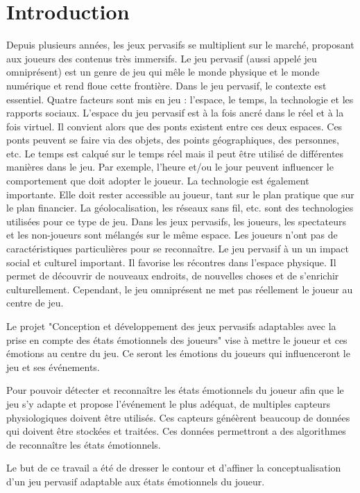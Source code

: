 \documentclass{article}
\begin{document}
\section{Introduction}
	Depuis plusieurs années, les jeux pervasifs se multiplient sur le marché, proposant aux joueurs des contenus très immersifs.
	Le jeu pervasif (aussi appelé jeu omniprésent) est un genre de jeu qui mêle le monde physique et le monde numérique et rend floue cette frontière.
	Dans le jeu pervasif, le contexte est essentiel. 
	Quatre facteurs sont mis en jeu : l'espace, le temps, la technologie et les rapports sociaux. 
	L'espace du jeu pervasif est à la fois ancré dans le réel et à la fois virtuel.
	Il convient alors que des ponts existent entre ces deux espaces. 
	Ces ponts peuvent se faire via des objets, des points géographiques, des personnes, etc. 
	Le temps est calqué sur le temps réel mais il peut être utilisé de différentes manières dans le jeu. 
	Par exemple, l'heure et/ou le jour peuvent influencer le comportement que doit adopter le joueur.
	La technologie est également importante. 
	Elle doit rester accessible au joueur, tant sur le plan pratique que sur le plan financier. 
	La géolocalisation, les réseaux sans fil, etc. sont des technologies utilisées pour ce type de jeu.
	Dans les jeux pervasifs, les joueurs, les spectateurs et les non-joueurs sont mélangés sur le même espace. 
	Les joueurs n'ont pas de caractéristiques particulières pour se reconnaître.%
	Le jeu pervasif à un un impact social et culturel important.
	Il favorise les récontres dans l'espace physique.
	Il permet de découvrir de nouveaux endroits, de nouvelles choses et de s'enrichir culturellement.
	Cependant, le jeu omniprésent ne met pas réellement le joueur au centre de jeu.\par
	Le projet "Conception et développement des jeux pervasifs adaptables avec la prise en compte des états émotionnels des joueurs" vise à mettre le joueur et ces émotions au centre du jeu.
	Ce seront les émotions du joueurs qui influenceront le jeu et ses événements.\par
	Pour pouvoir détecter et reconnaître les états émotionnels du joueur afin que le jeu s'y adapte et propose l'événement le plus adéquat, de multiples capteurs physiologiques doivent être utilisés.
	Ces capteurs généèrent beaucoup de données qui doivent être stockées et traitées.
	Ces données permettront a des algorithmes de reconnaître les états émotionnels.\par
	Le but de ce travail a été de dresser le contour et d'affiner la conceptualisation d'un jeu pervasif adaptable aux états émotionnels du joueur. 
\end{document}
